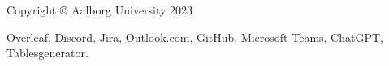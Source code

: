 \thispagestyle{empty}
{\small
\strut\vfill %
\noindent Copyright \copyright{} Aalborg University 2023\par
\vspace{0.2cm}
\noindent Overleaf, Discord, Jira, Outlook.com, GitHub, Microsoft Teams, ChatGPT, Tablesgenerator.
}
\clearpage